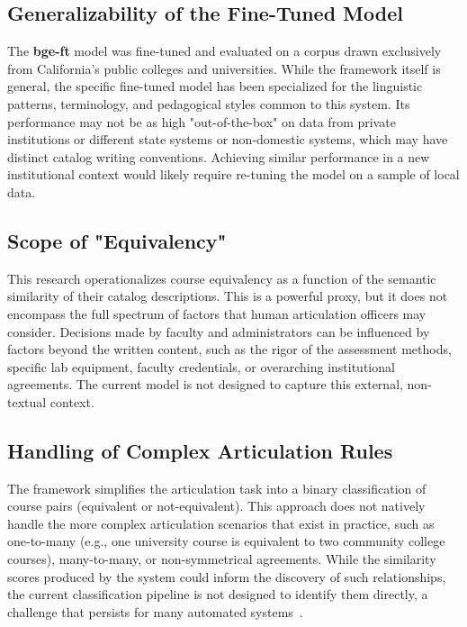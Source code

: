 \subsection{Generalizability of the Fine-Tuned Model}\label{ch:5.2.2}
The \textbf{bge-ft} model was fine-tuned and evaluated on a corpus drawn exclusively from California's public colleges and universities. While the framework itself is general, the specific fine-tuned model has been specialized for the linguistic patterns, terminology, and pedagogical styles common to this system. Its performance may not be as high "out-of-the-box" on data from private institutions or different state systems or non-domestic systems, which may have distinct catalog writing conventions. Achieving similar performance in a new institutional context would likely require re-tuning the model on a sample of local data.

\subsection{Scope of "Equivalency"}\label{ch:5.2.3}
This research operationalizes course equivalency as a function of the semantic similarity of their catalog descriptions. This is a powerful proxy, but it does not encompass the full spectrum of factors that human articulation officers may consider. Decisions made by faculty and administrators can be influenced by factors beyond the written content, such as the rigor of the assessment methods, specific lab equipment, faculty credentials, or overarching institutional agreements. The current model is not designed to capture this external, non-textual context.

\subsection{Handling of Complex Articulation Rules}\label{ch:5.2.4}
The framework simplifies the articulation task into a binary classification of course pairs (equivalent or not-equivalent). This approach does not natively handle the more complex articulation scenarios that exist in practice, such as one-to-many (e.g., one university course is equivalent to two community college courses), many-to-many, or non-symmetrical agreements. While the similarity scores produced by the system could inform the discovery of such relationships, the current classification pipeline is not designed to identify them directly, a challenge that persists for many automated systems~\cite{pardos10.1145/3330430.3333622}.

